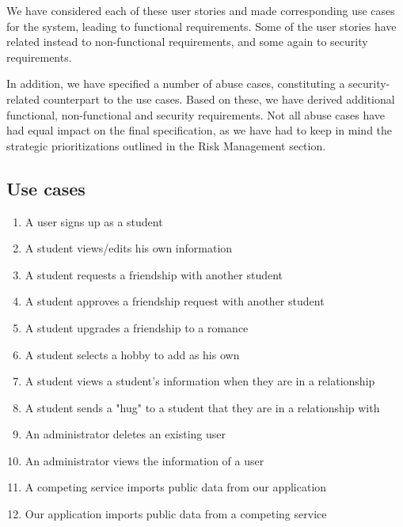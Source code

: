 \documentclass[a4paper]{article}
\begin{document}
We have considered each of these user stories and made corresponding use cases for the system, leading to functional requirements. Some of the user stories have related instead to non-functional requirements, and some again to security requirements.

In addition, we have specified a number of abuse cases, constituting a security-related counterpart to the use cases. Based on these, we have derived additional functional, non-functional and security requirements. Not all abuse cases have had equal impact on the final specification, as we have had to keep in mind the strategic prioritizations outlined in the Risk Management section.

\subsection{Use cases}
\begin{enumerate}
\item A user signs up as a student
\item A student views/edits his own information
\item A student requests a friendship with another student
\item A student approves a friendship request with another student
\item A student upgrades a friendship to a romance
\item A student selects a hobby to add as his own
\item A student views a student’s information when they are in a relationship
\item A student sends a "hug" to a student that they are in a relationship with
\item An administrator deletes an existing user
\item An administrator views the information of a user
\item A competing service imports public data from our application
\item Our application imports public data from a competing service
\end{enumerate}
\end{document}
